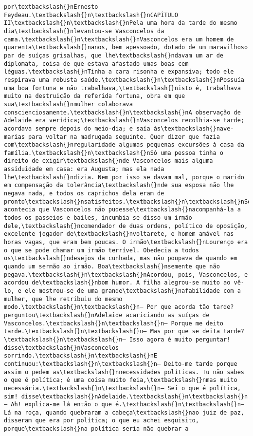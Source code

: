 \documentclass[11pt]{article}
\begin{document}
\begin{Verbatim}[commandchars=\\\{\}]
por\textbackslash{}nErnesto Feydeau.\textbackslash{}n\textbackslash{}nCAPÍTULO II\textbackslash{}n\textbackslash{}nPela uma hora da tarde do mesmo dia\textbackslash{}nlevantou-se Vasconcelos da cama.\textbackslash{}n\textbackslash{}nVasconcelos era um homem de quarenta\textbackslash{}nanos, bem apessoado, dotado de um maravilhoso par de suíças grisalhas, que lhe\textbackslash{}ndavam um ar de diplomata, coisa de que estava afastado umas boas cem léguas.\textbackslash{}nTinha a cara risonha e expansiva; todo ele respirava uma robusta saúde.\textbackslash{}n\textbackslash{}nPossuía uma boa fortuna e não trabalhava,\textbackslash{}nisto é, trabalhava muito na destruição da referida fortuna, obra em que sua\textbackslash{}nmulher colaborava conscienciosamente.\textbackslash{}n\textbackslash{}nA observação de Adelaide era verídica;\textbackslash{}nVasconcelos recolhia-se tarde; acordava sempre depois do meio-dia; e saía às\textbackslash{}nave-marias para voltar na madrugada seguinte. Quer dizer que fazia com\textbackslash{}nregularidade algumas pequenas excursões à casa da família.\textbackslash{}n\textbackslash{}nSó uma pessoa tinha o direito de exigir\textbackslash{}nde Vasconcelos mais alguma assiduidade em casa: era Augusta; mas ela nada lhe\textbackslash{}ndizia. Nem por isso se davam mal, porque o marido em compensação da tolerância\textbackslash{}nde sua esposa não lhe negava nada, e todos os caprichos dela eram de pronto\textbackslash{}nsatisfeitos.\textbackslash{}n\textbackslash{}nSe acontecia que Vasconcelos não pudesse\textbackslash{}nacompanhá-la a todos os passeios e bailes, incumbia-se disso um irmão dele,\textbackslash{}ncomendador de duas ordens, político de oposição, excelente jogador de\textbackslash{}nvoltarete, e homem amável nas horas vagas, que eram bem poucas. O irmão\textbackslash{}nLourenço era o que se pode chamar um irmão terrível. Obedecia a todos os\textbackslash{}ndesejos da cunhada, mas não poupava de quando em quando um sermão ao irmão. Boa\textbackslash{}nsemente que não pegava.\textbackslash{}n\textbackslash{}nAcordou, pois, Vasconcelos, e acordou de\textbackslash{}nbom humor. A filha alegrou-se muito ao vê-lo, e ele mostrou-se de uma grande\textbackslash{}nafabilidade com a mulher, que lhe retribuiu do mesmo modo.\textbackslash{}n\textbackslash{}n— Por que acorda tão tarde? perguntou\textbackslash{}nAdelaide acariciando as suíças de Vasconcelos.\textbackslash{}n\textbackslash{}n— Porque me deito tarde.\textbackslash{}n\textbackslash{}n— Mas por que se deita tarde?\textbackslash{}n\textbackslash{}n— Isso agora é muito perguntar! disse\textbackslash{}nVasconcelos sorrindo.\textbackslash{}n\textbackslash{}nE continuou:\textbackslash{}n\textbackslash{}n— Deito-me tarde porque assim o pedem as\textbackslash{}nnecessidades políticas. Tu não sabes o que é política; é uma coisa muito feia,\textbackslash{}nmas muito necessária.\textbackslash{}n\textbackslash{}n— Sei o que é política, sim! disse\textbackslash{}nAdelaide.\textbackslash{}n\textbackslash{}n— Ah! explica-me lá então o que é.\textbackslash{}n\textbackslash{}n— Lá na roça, quando quebraram a cabeça\textbackslash{}nao juiz de paz, disseram que era por política; o que eu achei esquisito, porque\textbackslash{}na política seria não quebrar a 
\end{Verbatim}
\end{document}
